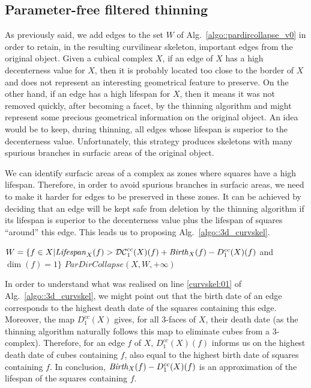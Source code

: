 \documentclass[final,envcountsame]{llncs}
\def\mydist1{D_1}
\def\mydecent{\mathcal{DC}_1}
\def\cplDist1#1{\mydist1^{cc}(#1)}
\def\cpldecent#1{\mydecent^{cc}(#1)}
\def\quotes#1{``#1''}
\def\birth#1#2{\mbox{\it{}Birth\/}_{#2}(#1)}
\def\lifespan#1#2{\mbox{\it{}Lifespan\/}_{#2}(#1)}
\def\allfaces#1{\mathbb{F}^{#1}}
\def\subcomplex#1#2{#1 \preceq #2}
\def\complex#1#2{\subcomplex{#2}{\allfaces{#1}}}
\def\mydim#1{\dim(#1)}
\begin{document}
\subsection{Parameter-free filtered thinning}
As previously said, we add edges to the set $W$ of Alg.~\ref{algo::pardircollapse_v0} in order to retain, in the resulting curvilinear skeleton, important edges from the original object. Given a cubical complex $X$, if an edge of $X$ has a high decenterness value for $X$, then it is probably located too close to the border of $X$ and does not represent an interesting geometrical feature to preserve.
On the other hand, if an edge has a high lifespan for $X$, then it means it was not removed quickly, after becoming a facet, by the thinning algorithm and might represent some precious geometrical information on the original object. An idea would be to keep, during thinning, all edges whose lifespan is superior to the decenterness value. Unfortunately, this strategy produces skeletons with many spurious branches in surfacic areas of the original object.

We can identify surfacic areas of a complex as zones where squares have a high lifespan. Therefore, in order to avoid spurious branches in surfacic areas, we need to make it harder for edges to be preserved in these zones. It can be achieved by deciding that an edge will be kept safe from deletion by the thinning algorithm if its lifespan is superior to the decenterness value plus the lifespan of squares \quotes{around} this edge. This leads us to proposing Alg.~\ref{algo::3d_curvskel}. 

\begin{algorithm}[tb]
\label{algo::3d_curvskel}
\caption[CurvilinearSkeleton]{$CurvilinearSkeleton(X)$}
\KwData{A cubical complex $\complex{3}{X}$}
\KwResult{A cubical complex $\complex{3}{Y}$}
$W=\{f \in X | \lifespan{f}{X} > \cpldecent{X}(f) + \birth{f}{X} - \cplDist1{X}(f)$ and $\mydim{f}=1\}$  \label{curvskel:01}  \; 
\Return $ParDirCollapse(X,W,+\infty)$\;
\end{algorithm}

In order to understand what was realised on line \ref{curvskel:01} of Alg.~\ref{algo::3d_curvskel}, we might point out that the birth date of an edge corresponds to the highest death date of the squares containing this edge. Moreover, the map $\cplDist1{X}$ gives, for all 3-faces of $X$, their death date (as the thinning algorithm naturally follows this map to eliminate cubes from a 3-complex). Therefore, for an edge $f$ of $X$, $\cplDist1{X}(f)$ informs us on the highest death date of cubes containing $f$, also equal to the highest birth date of squares containing $f$. In conclusion, $\birth{f}{X} - \cplDist1{X}(f)$ is an approximation of the lifespan of the squares containing $f$.
\end{document}

